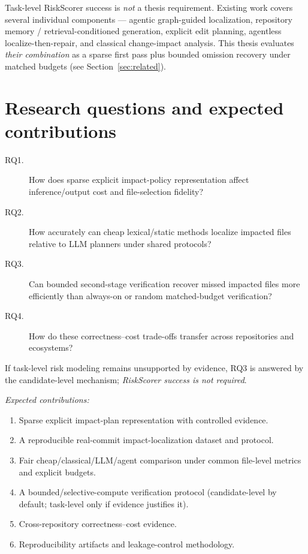 \documentclass[11pt,a4paper]{article}
\begin{document}
Task-level RiskScorer success is \emph{not} a thesis requirement. Existing work
covers several individual components --- agentic graph-guided localization,
repository memory / retrieval-conditioned generation, explicit edit planning,
agentless localize-then-repair, and classical change-impact analysis. This
thesis evaluates \emph{their combination} as a sparse first pass plus bounded
omission recovery under matched budgets (see Section~\ref{sec:related}).

\section{Research questions and expected contributions}
\label{sec:rq}

\begin{description}
  \item[RQ1.] How does sparse explicit impact-policy representation affect
  inference/output cost and file-selection fidelity?
  \item[RQ2.] How accurately can cheap lexical/static methods localize impacted
  files relative to LLM planners under shared protocols?
  \item[RQ3.] Can bounded second-stage verification recover missed impacted
  files more efficiently than always-on or random matched-budget verification?
  \item[RQ4.] How do these correctness--cost trade-offs transfer across
  repositories and ecosystems?
\end{description}

If task-level risk modeling remains unsupported by evidence, RQ3 is answered by
the candidate-level mechanism; \emph{RiskScorer success is not required}.

\emph{Expected contributions:}
\begin{enumerate}
  \item Sparse explicit impact-plan representation with controlled evidence.
  \item A reproducible real-commit impact-localization dataset and protocol.
  \item Fair cheap/classical/LLM/agent comparison under common file-level
        metrics and explicit budgets.
  \item A bounded/selective-compute verification protocol (candidate-level by
        default; task-level only if evidence justifies it).
  \item Cross-repository correctness--cost evidence.
  \item Reproducibility artifacts and leakage-control methodology.
\end{enumerate}
\end{document}
